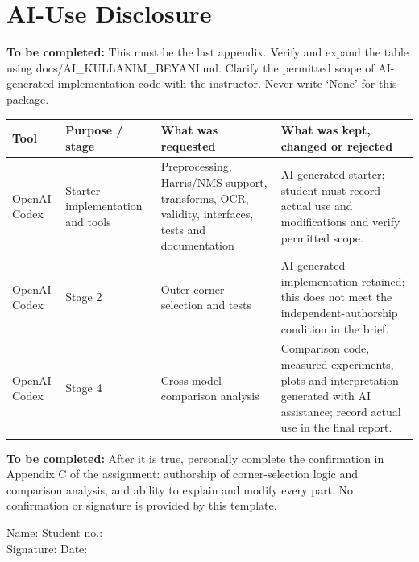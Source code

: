 \documentclass[conference]{IEEEtran}
\newcommand{\draftnote}[1]{\par\noindent\textbf{To be completed:} #1\par}
\begin{document}
\section{AI-Use Disclosure}
\draftnote{This must be the last appendix. Verify and expand the table using
docs/AI\_KULLANIM\_BEYANI.md. Clarify the permitted scope of AI-generated implementation
code with the instructor. Never write `None' for this package.}
\begin{table}[ht]
\centering
\small
\begin{tabular}{p{}p{}p{}p{}}
\toprule
Tool & Purpose / stage & What was requested & What was kept, changed or rejected\\
\midrule
OpenAI Codex & Starter implementation and tools & Preprocessing, Harris/NMS support,
transforms, OCR, validity, interfaces, tests and documentation & AI-generated starter;
student must record actual use and modifications and verify permitted scope.\\
OpenAI Codex & Stage 2 & Outer-corner selection and tests &
AI-generated implementation retained; this does not meet the independent-authorship condition in the brief.\\
OpenAI Codex & Stage 4 & Cross-model comparison analysis &
Comparison code, measured experiments, plots and interpretation generated with AI assistance; record actual use in the final report.\\
\bottomrule
\end{tabular}
\end{table}
\draftnote{After it is true, personally complete the confirmation in Appendix C
of the assignment: authorship of corner-selection logic and comparison analysis,
and ability to explain and modify every part. No confirmation or signature is
provided by this template.}
Name: \underline{\hspace{25mm}}\quad Student no.: \underline{\hspace{20mm}}\\
Signature: \underline{\hspace{22mm}}\quad Date: \underline{\hspace{20mm}}
\end{document}
